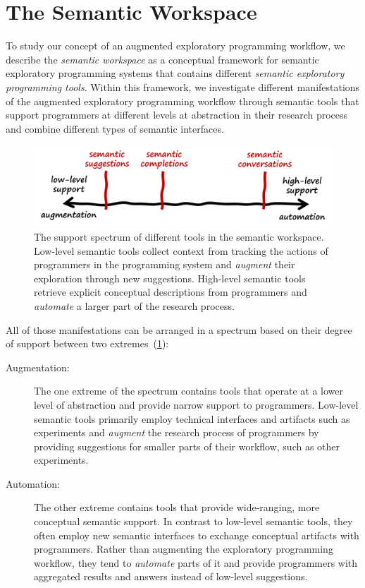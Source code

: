 
\section{The Semantic Workspace}
\label{sec:approach/workspace}

To study our concept of an augmented exploratory programming workflow, we describe the \emph{semantic workspace} as a conceptual framework for semantic exploratory programming systems that contains different \emph{semantic exploratory programming tools}.
Within this framework, we investigate different manifestations of the augmented exploratory programming workflow through semantic tools that support programmers at different levels at abstraction in their research process and combine different types of semantic interfaces.

\begin{figure}
	\centering
	\includegraphics[width=.85\textwidth]{02_workspace/spectrum.png}
	\caption[The support spectrum of different \emph{semantic tools} in the semantic workspace.]{
		The support spectrum of different tools in the semantic workspace.
		Low-level semantic tools collect context from tracking the actions of programmers in the programming system and \emph{augment} their exploration through new suggestions.
		High-level semantic tools retrieve explicit conceptual descriptions from programmers and \emph{automate} a larger part of the research process.
	}
	\label{fig:approach/workspace/spectrum}
\end{figure}

All of those manifestations can be arranged in a spectrum based on their degree of support between two extremes~(\cref{fig:approach/workspace/spectrum}):

\begin{description}
	\item[Augmentation:]
	The one extreme of the spectrum contains tools that operate at a lower level of abstraction and provide narrow support to programmers.
	Low-level semantic tools primarily employ technical interfaces and artifacts such as experiments and \emph{augment} the research process of programmers by providing suggestions for smaller parts of their workflow, such as other experiments.

	\item[Automation:]
	The other extreme contains tools that provide wide-ranging, more conceptual semantic support.
	In contrast to low-level semantic tools, they often employ new semantic interfaces to exchange conceptual artifacts with programmers.
	Rather than augmenting the exploratory programming workflow, they tend to \emph{automate} parts of it and provide programmers with aggregated results and answers instead of low-level suggestions.
\end{description}

